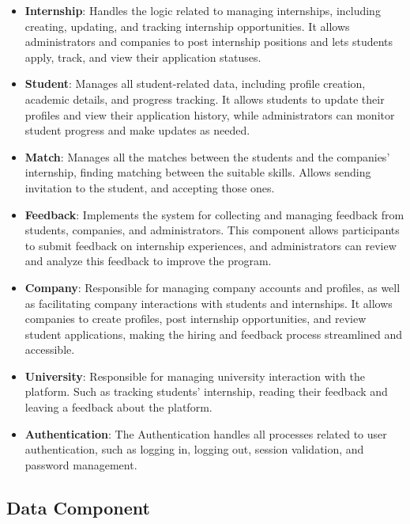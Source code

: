 \begin{itemize}
\item \textbf{Internship}: Handles the logic related to managing internships, including creating, updating, and tracking internship opportunities. It allows administrators and companies to post internship positions and lets students apply, track, and view their application statuses.

\item \textbf{Student}: Manages all student-related data, including profile creation, academic details, and progress tracking. It allows students to update their profiles and view their application history, while administrators can monitor student progress and make updates as needed.

\item \textbf{Match}: Manages all the matches between the students and the companies' internship, finding matching between the suitable skills. Allows sending invitation to the student, and accepting those ones.

\item \textbf{Feedback}: Implements the system for collecting and managing feedback from students, companies, and administrators. This component allows participants to submit feedback on internship experiences, and administrators can review and analyze this feedback to improve the program.

\item \textbf{Company}: Responsible for managing company accounts and profiles, as well as facilitating company interactions with students and internships. It allows companies to create profiles, post internship opportunities, and review student applications, making the hiring and feedback process streamlined and accessible.

\item \textbf{University}: Responsible for managing university interaction with the platform. Such as tracking students' internship, reading their feedback and leaving a feedback about the platform.


\item \textbf{Authentication}:
The Authentication handles all processes related to user authentication, such as logging in, logging out, session validation, and password management.
\end{itemize}

\subsection{Data Component}

